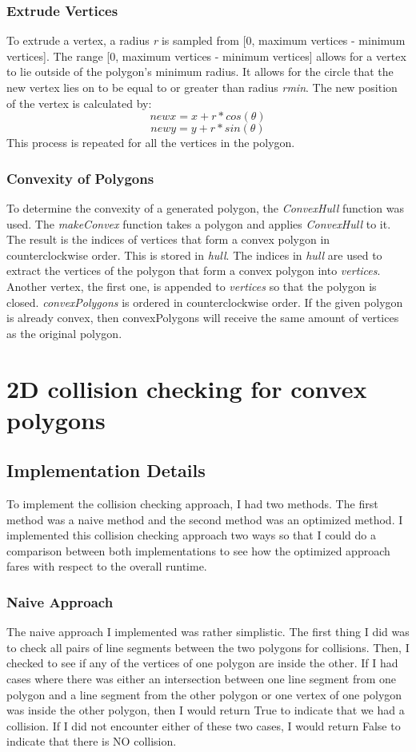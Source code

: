 \documentclass{article}
\begin{document}
\subsubsection{Extrude Vertices}
To extrude a vertex, a radius \textit{r} is sampled from [0, maximum vertices - minimum vertices]. The range [0, maximum vertices - minimum vertices] allows for a vertex to lie outside of the polygon's minimum radius. It allows for the circle that the new vertex lies on to be equal to or greater than radius \textit{rmin}. The new position of the vertex is calculated by: 
    \[new x = x + r*cos(\theta)\]
    \[new y = y + r*sin(\theta)\]
This process is repeated for all the vertices in the polygon. 
\subsubsection{Convexity of Polygons}
To determine the convexity of a generated polygon, the \textit{ConvexHull} function was used. The \textit{makeConvex} function takes a polygon and applies \textit{ConvexHull} to it. The result is the indices of vertices that form a convex polygon in counterclockwise order. This is stored in \textit{hull}. The indices in \textit{hull} are used to extract the vertices of the polygon that form a convex polygon into \textit{vertices}. Another vertex, the first one, is appended to \textit{vertices} so that the polygon is closed. \textit{convexPolygons} is ordered in counterclockwise order. If the given polygon is already convex, then convexPolygons will receive the same amount of vertices as the original polygon. 

\section{2D collision checking for convex polygons}
\subsection{Implementation Details} 
To implement the collision checking approach, I had two methods. The first method was a naive method and the second method was an optimized method. I implemented this collision checking approach two ways so that I could do a comparison between both implementations to see how the optimized approach fares with respect to the overall runtime. 

\subsubsection{Naive Approach}
The naive approach I implemented was rather simplistic. The first thing I did was to check all pairs of line segments between the two polygons for collisions. Then, I checked to see if any of the vertices of one polygon are inside the other. If I had cases where there was either an intersection between one line segment from one polygon and a line segment from the other polygon or one vertex of one polygon was inside the other polygon, then I would return True to indicate that we had a collision. If I did not encounter either of these two cases, I would return False to indicate that there is NO collision.  
\end{document}
